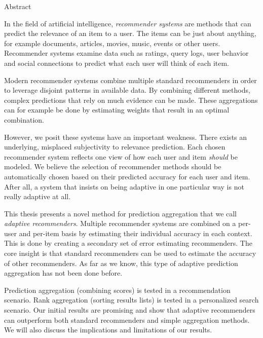 \null\vspace{4em}
{
  \centering
  \normalfont
  \huge
  \noindent
  Abstract\\
}
\vspace{2em}

\noindent
In the field of artificial intelligence,
\emph{recommender systems} are methods
that can predict the relevance of an item to a user.
The items can be just about anything, for example 
documents, articles, movies, music, events or other users.
Recommender systems examine data such as ratings, query logs,
user behavior and social connections to predict
what each user will think of each item.

Modern recommender systems
combine multiple standard recommenders
in order to leverage disjoint patterns in available data.
By combining different methods,
complex predictions that rely on much evidence can be made.
These aggregations can for example be done 
by estimating weights that result in an optimal combination.

However, we posit these systems have an important weakness.
There exists an underlying, misplaced subjectivity to relevance prediction.
Each chosen recommender system reflects one view of 
how each user and item \emph{should} be modeled.
We believe the selection of recommender methods should 
be automatically chosen based on their predicted accuracy for each user and item.
After all, a system that insists on being adaptive
in one particular way is not really adaptive at all.

This thesis presents a novel method for prediction aggregation
that we call \emph{adaptive recommenders}.
Multiple recommender systems are combined on a per-user and per-item basis
by estimating their individual accuracy in each context.
This is done by creating a secondary set of error estimating recommenders.
The core insight is that standard recommenders can be used
to estimate the accuracy of other recommenders.
As far as we know, this type of adaptive prediction aggregation
has not been done before.

Prediction aggregation (combining scores) is tested in a recommendation scenario.
Rank aggregation (sorting results lists) is tested in a personalized search scenario.
Our initial results are promising and show that adaptive recommenders
can outperform both standard recommenders and simple aggregation methods.
We will also discuss the implications and limitations of our results.

\cleardoublepage
